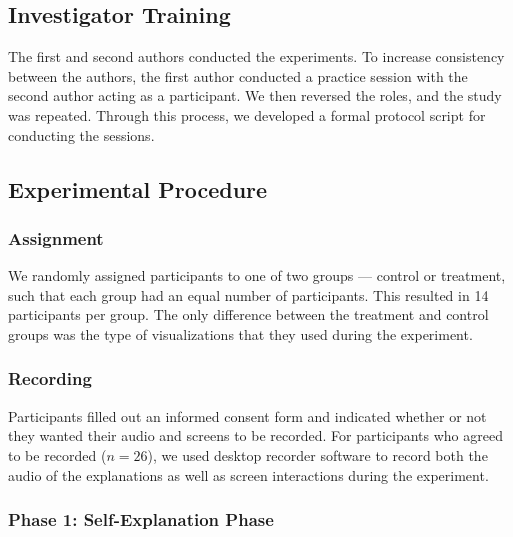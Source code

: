 \documentclass[conference]{IEEEtran}
\begin{document}
\subsection{Investigator Training}

The first and second authors conducted the experiments. To increase consistency between the authors, the first author conducted a practice session with the second author acting as a participant. We then reversed the roles, and the study was repeated. Through this process, we developed a formal protocol script for conducting the sessions.

\subsection{Experimental Procedure}


\subsubsection{Assignment}
We randomly assigned participants to one of two groups --- control or treatment, such that each group had an equal number of participants. This resulted in 14 participants per group. The only difference between the treatment and control groups was the type of visualizations that they used during the experiment.

\subsubsection{Recording}
Participants filled out an informed consent form and indicated whether or not they wanted their audio and screens to be recorded. For participants who agreed to be recorded ($n=26$), we used desktop recorder software to record both the audio of the explanations as well as screen interactions during the experiment.

\subsubsection{Phase 1: Self-Explanation Phase}

\end{document}
